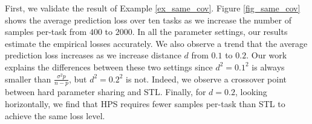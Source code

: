First, we validate the result of Example \ref{ex_same_cov}.
Figure \ref{fig_same_cov} shows the average prediction loss over ten tasks as we increase the number of samples per-task from $400$ to $2000$.
In all the parameter settings, our results estimate the empirical losses accurately.
We also observe a trend that the average prediction loss increases as we increase distance $d$ from $0.1$ to $0.2$.
Our work explains the differences between these two settings since $d^2 = 0.1^2$ is always smaller than $\frac{\sigma^2 p}{n - p}$, but $d^2 = 0.2^2$ is not.
Indeed, we observe a crossover point between hard parameter sharing and STL.
Finally, for $d = 0.2$, looking horizontally, we find that HPS requires fewer samples per-task than STL to achieve the same loss level. %







